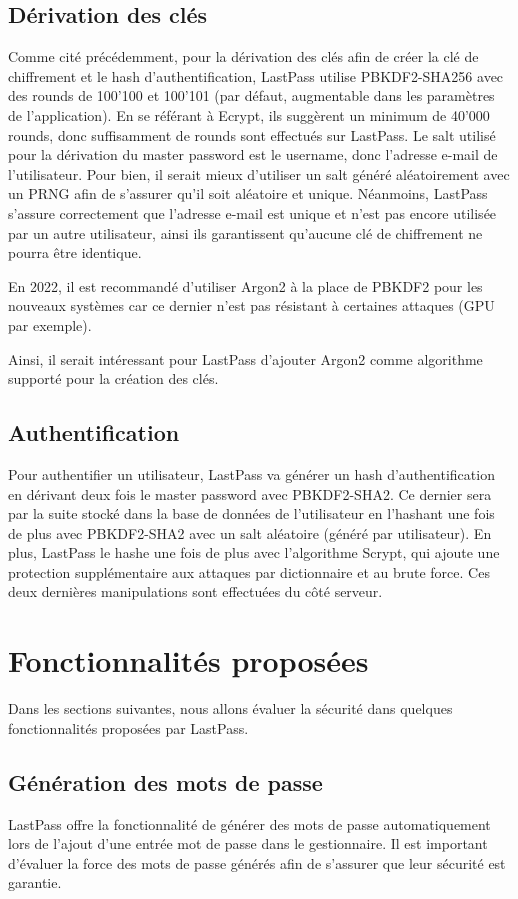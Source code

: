 \subsection{Dérivation des clés}
Comme cité précédemment, pour la dérivation des clés afin de créer la clé de chiffrement et le hash d'authentification, LastPass utilise PBKDF2-SHA256 avec des rounds de 100'100 et 100'101 (par défaut, augmentable dans les paramètres de l'application). En se référant à Ecrypt, ils suggèrent un minimum de 40'000 rounds, donc suffisamment de rounds sont effectués sur LastPass. Le salt utilisé pour la dérivation du master password est le username, donc l'adresse e-mail de l'utilisateur. Pour bien, il serait mieux d'utiliser un salt généré aléatoirement avec un PRNG afin de s'assurer qu'il soit aléatoire et unique. Néanmoins, LastPass s'assure correctement que l'adresse e-mail est unique et n'est pas encore utilisée par un autre utilisateur, ainsi ils garantissent qu'aucune clé de chiffrement ne pourra être identique.

En 2022, il est recommandé d'utiliser Argon2 à la place de PBKDF2 pour les nouveaux systèmes car ce dernier n'est pas résistant à certaines attaques (GPU par exemple).\cite{medium}

Ainsi, il serait intéressant pour LastPass d'ajouter Argon2 comme algorithme supporté pour la création des clés.
\subsection{Authentification}
Pour authentifier un utilisateur, LastPass va générer un hash d'authentification en dérivant deux fois le master password avec PBKDF2-SHA2. Ce dernier sera par la suite stocké dans la base de données de l'utilisateur en l'hashant une fois de plus avec PBKDF2-SHA2 avec un salt aléatoire (généré par utilisateur). En plus, LastPass le hashe une fois de plus avec l'algorithme Scrypt, qui ajoute une protection supplémentaire aux attaques par dictionnaire et au brute force. Ces deux dernières manipulations sont effectuées du côté serveur.
\section{Fonctionnalités proposées}
Dans les sections suivantes, nous allons évaluer la sécurité dans quelques fonctionnalités proposées par LastPass. 
\subsection{Génération des mots de passe}
\label{lp_pw}
LastPass offre la fonctionnalité de générer des mots de passe automatiquement lors de l'ajout d'une entrée mot de passe dans le gestionnaire. Il est important d'évaluer la force des mots de passe générés afin de s'assurer que leur sécurité est garantie.

